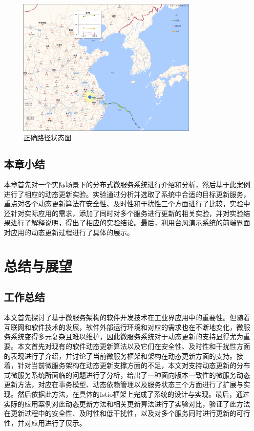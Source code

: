 \documentclass[macfonts,master]{njuthesis}
\begin{document}
\begin{figure}[!htbp]
  \centering
  \includegraphics[width= 0.8\textwidth]{image/running_v2.png}
  \caption{正确路径状态图}
  \label{fig:running_v2}
\end{figure}

\section{本章小结}
本章首先对一个实际场景下的分布式微服务系统进行介绍和分析，然后基于此案例进行了相应的动态更新实验。实验通过分析并选取了系统中合适的目标更新服务，重点对各个动态更新算法在安全性、及时性和干扰性三个方面进行了比较，实验中还针对实际应用的需求，添加了同时对多个服务进行更新的相关实验，并对实验结果进行了解释说明，得出了相应的实验结论。最后，利用台风演示系统的前端界面对应用的动态更新过程进行了具体的展示。

\chapter{总结与展望}\label{chapter_concludesion}

\section{工作总结}
本文首先探讨了基于微服务架构的软件开发技术在工业界应用中的重要性。但随着互联网和软件技术的发展，软件外部运行环境和对应的需求也在不断地变化，微服务系统变得多元复杂且难以维护，因此微服务系统对于动态更新的支持显得尤为重要。本文首先对现有的软件动态更新算法以及它们在安全性、及时性和干扰性方面的表现进行了介绍，并讨论了当前微服务框架和架构在动态更新方面的支持。接着，针对当前微服务架构在动态更新支撑方面的不足，本文对支持动态更新的分布式微服务系统所面临的问题进行了分析，给出了一种面向版本一致性的微服务动态更新方法，对应在事务模型、动态依赖管理以及服务状态三个方面进行了扩展与实现。然后依据此方法，在具体的Istio框架上完成了系统的设计与实现。最后，通过实际的应用案例对此动态更新方法和相关更新算法进行了实验对比，验证了此方法在更新过程中的安全性、及时性和低干扰性，以及对多个服务同时进行更新的可行性，并对应用进行了展示。
\end{document}
